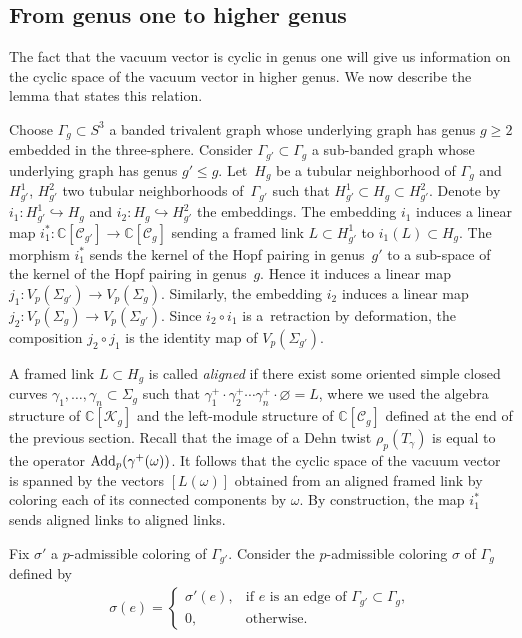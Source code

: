\documentclass[11pt]{article}
\numberwithin{equation}{section}
\begin{document}
\subsection{From genus one to higher genus}

The fact that the vacuum vector is cyclic in genus one will give us information on the cyclic space of the vacuum vector in higher genus. We now describe the lemma that states this relation.

Choose $\Gamma_g \subset {S}^3$ a banded trivalent graph whose underlying graph has genus $g\geq 2$ embedded in the three-sphere. Consider $\Gamma_{g'}\subset \Gamma_g$ a sub-banded graph whose underlying graph has genus $g'\leq g$. Let~$H_g$ be a tubular neighborhood of $\Gamma_g$ and $H_{g'}^1$, $H_{g'}^2$ two tubular neighborhoods of~$\Gamma_{g'}$ such that $H_{g'}^1\subset H_g \subset H_{g'}^2$. Denote by $i_1\colon H_{g'}^1 \hookrightarrow H_g$ and $i_2\colon H_g \hookrightarrow H_{g'}^2$ the embeddings. The embedding $i_1$ induces a linear map $i_1^*\colon \mathbb{C}[\mathcal{C}_{g'}] \rightarrow \mathbb{C}[\mathcal{C}_g]$ sending a framed link $L\subset H_{g'}^1$ to $i_1(L) \subset H_g$. The morphism $i_1^*$ sends the kernel of the Hopf pairing in genus~$g'$ to a sub-space of the kernel of the Hopf pairing in genus~$g$. Hence it induces a linear map $j_1 \colon V_p(\Sigma_{g'}) \rightarrow V_p(\Sigma_g)$. Similarly, the embedding $i_2$ induces a linear map $j_2\colon V_p(\Sigma_g) \rightarrow V_p(\Sigma_{g'})$. Since $i_2 \circ i_1$ is a~retraction by deformation, the composition $j_2\circ j_1$ is the identity map of $V_p(\Sigma_{g'})$.

A framed link $L\subset H_g$ is called \textit{aligned} if there exist some oriented simple closed curves $\gamma_1, \ldots, \gamma_n\subset \Sigma_g$ such that $\gamma_1^+ \cdot \gamma_2^+ \cdots \gamma_n^+ \cdot \varnothing = L$, where we used the algebra structure of $\mathbb{C}[\mathcal{K}_g]$ and the left-module structure of $\mathbb{C}[\mathcal{C}_g]$ defined at the end of the previous section. Recall that the image of a Dehn twist $\rho_p(T_{\gamma})$ is equal to the operator $\operatorname{Add}_p(\gamma^+(\omega))$. It follows that the cyclic space of the vacuum vector is spanned by the vectors $[L(\omega)]$ obtained from an aligned framed link by coloring each of its connected components by $\omega$. By construction, the map $i_1^*$ sends aligned links to aligned links.

Fix $\sigma'$ a $p$-admissible coloring of $\Gamma_{g'}$. Consider the $p$-admissible coloring $\sigma$ of $\Gamma_g$ defined by
\begin{gather*} \sigma(e)= \begin{cases}
\sigma'(e), & \text{if $e$ is an edge of $\Gamma_{g'}\subset \Gamma_g$},\\
0, & \text{otherwise}.
\end{cases}\end{gather*}
\end{document}
